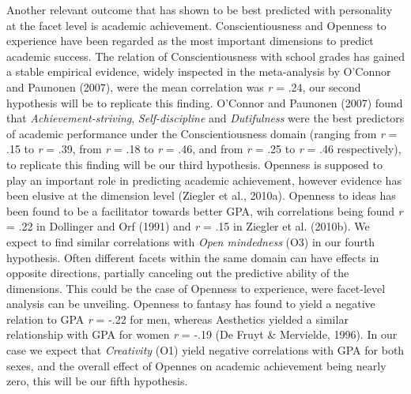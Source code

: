 \documentclass[,man,floatsintext]{apa6}
\theoremstyle{definition}
\theoremstyle{definition}
\theoremstyle{definition}
\theoremstyle{remark}
\begin{document}
Another relevant outcome that has shown to be best predicted with
personality at the facet level is academic achievement.
Conscientiousness and Openness to experience have been regarded as the
most important dimensions to predict academic success. The relation of
Conscientiousness with school grades has gained a stable empirical
evidence, widely inspected in the meta-analysis by O'Connor and Paunonen
(2007), were the mean correlation was \emph{r} = .24, our second
hypothesis will be to replicate this finding. O'Connor and Paunonen
(2007) found that \emph{Achievement-striving}, \emph{Self-discipline}
and \emph{Dutifulness} were the best predictors of academic performance
under the Conscientiousness domain (ranging from \emph{r} = .15 to
\emph{r} = .39, from \emph{r} = .18 to \emph{r} = .46, and from \emph{r}
= .25 to \emph{r} = .46 respectively), to replicate this finding will be
our third hypothesis. Openness is supposed to play an important role in
predicting academic achievement, however evidence has been elusive at
the dimension level (Ziegler et al., 2010a). Openness to ideas has been
found to be a facilitator towards better GPA, wih correlations being
found \emph{r} = .22 in Dollinger and Orf (1991) and \emph{r} = .15 in
Ziegler et al. (2010b). We expect to find similar correlations with
\emph{Open mindedness} (O3) in our fourth hypothesis. Often different
facets within the same domain can have effects in opposite directions,
partially canceling out the predictive ability of the dimensions. This
could be the case of Openness to experience, were facet-level analysis
can be unveiling. Openness to fantasy has found to yield a negative
relation to GPA \emph{r} = -.22 for men, whereas Aesthetics yielded a
similar relationship with GPA for women \emph{r} = -.19 (De Fruyt \&
Mervielde, 1996). In our case we expect that \emph{Creativity} (O1)
yield negative correlations with GPA for both sexes, and the overall
effect of Opennes on academic achievement being nearly zero, this will
be our fifth hypothesis.
\end{document}
